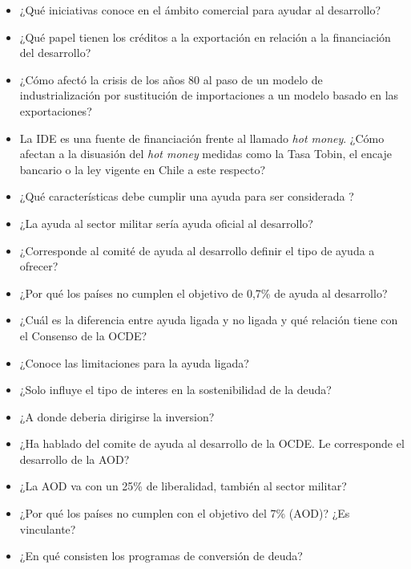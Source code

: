 \documentclass{nuevotema}
\begin{document}
\begin{itemize}
    \item ¿Qué iniciativas conoce en el ámbito comercial para ayudar al desarrollo?
    \item ¿Qué papel tienen los créditos a la exportación en relación a la financiación del desarrollo?
    \item ¿Cómo afectó la crisis de los años 80 al paso de un modelo de industrialización por sustitución de importaciones a un modelo basado en las exportaciones?
    \item La IDE es una fuente de financiación frente al llamado \textit{hot money}. ¿Cómo afectan a la disuasión del \textit{hot money} medidas como la Tasa Tobin, el encaje bancario o la ley vigente en Chile a este respecto?
    \item ¿Qué características debe cumplir una ayuda para ser considerada ?
    \item ¿La ayuda al sector militar sería ayuda oficial al desarrollo?
    \item ¿Corresponde al comité de ayuda al desarrollo definir el tipo de ayuda a ofrecer?
    \item ¿Por qué los países no cumplen el objetivo de 0,7\% de ayuda al desarrollo?
    \item ¿Cuál es la diferencia entre ayuda ligada y no ligada y qué relación tiene con el Consenso de la OCDE?
\end{itemize}

\begin{itemize}
    \item ¿Conoce las limitaciones para la ayuda ligada?
    \item ¿Solo influye el tipo de interes en la sostenibilidad de la deuda?
    \item ¿A donde deberia dirigirse la inversion?
    \item ¿Ha hablado del comite de ayuda al desarrollo de la OCDE. Le corresponde el desarrollo de la AOD?
    \item ¿La AOD va con un 25\% de liberalidad, también al sector militar?
    \item ¿Por qué los países no cumplen con el objetivo del 7\% (AOD)? ¿Es vinculante?
    \item ¿En qué consisten los programas de conversión de deuda?
\end{itemize}

\notas
\end{document}
